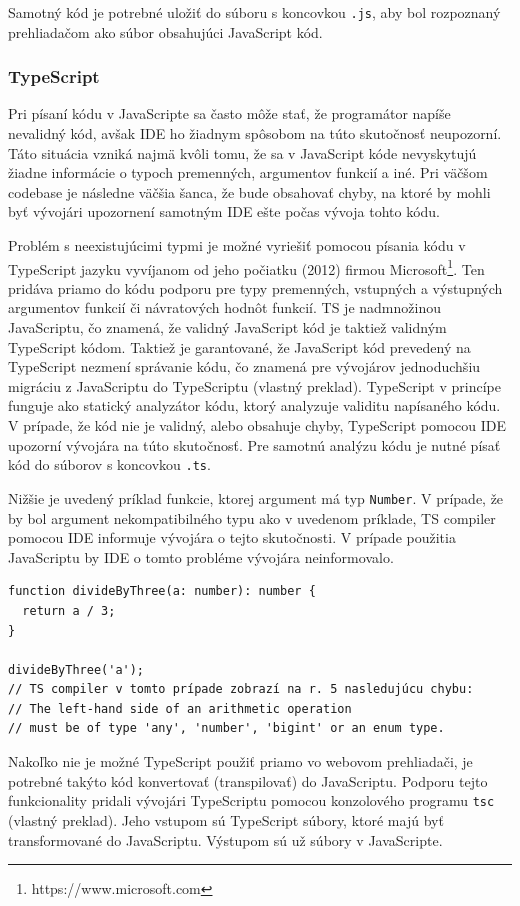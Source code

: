 Samotný kód je potrebné uložiť do súboru s koncovkou \texttt{.js}, aby bol rozpoznaný prehliadačom ako súbor obsahujúci JavaScript kód.

\subsubsection {TypeScript}
Pri písaní kódu v JavaScripte sa často môže stať, že programátor napíše nevalidný kód, avšak IDE ho žiadnym spôsobom na túto skutočnosť neupozorní. Táto situácia vzniká najmä kvôli tomu, že sa v JavaScript kóde nevyskytujú žiadne informácie o typoch premenných, argumentov funkcií a iné. Pri väčšom codebase je následne väčšia šanca, že bude obsahovať chyby, na ktoré by mohli byť vývojári upozornení samotným IDE ešte počas vývoja tohto kódu.

Problém s neexistujúcimi typmi je možné vyriešiť pomocou písania kódu v TypeScript jazyku vyvíjanom od jeho počiatku (2012) firmou Microsoft\footnote{https://www.microsoft.com}. Ten pridáva priamo do kódu podporu pre typy premenných, vstupných a výstupných argumentov funkcií či návratových hodnôt funkcií. TS je nadmnožinou JavaScriptu, čo znamená, že validný JavaScript kód je taktiež validným TypeScript kódom. Taktiež je garantované, že JavaScript kód prevedený na TypeScript nezmení správanie kódu, čo znamená pre vývojárov jednoduchšiu migráciu z JavaScriptu do TypeScriptu \cite{about_typescript} (vlastný preklad). TypeScript v princípe funguje ako statický analyzátor kódu, ktorý analyzuje validitu napísaného kódu. V prípade, že kód nie je validný, alebo obsahuje chyby, TypeScript pomocou IDE upozorní vývojára na túto skutočnosť. Pre samotnú analýzu kódu je nutné písať kód do súborov s koncovkou \texttt{.ts}.

Nižšie je uvedený príklad funkcie, ktorej argument má typ \texttt{Number}. V prípade, že by bol argument nekompatibilného typu ako v uvedenom príklade, TS compiler pomocou IDE informuje vývojára o tejto skutočnosti. V prípade použitia JavaScriptu by IDE o tomto probléme vývojára neinformovalo. 
\begin{verbatim}
function divideByThree(a: number): number {
  return a / 3;
}

divideByThree('a');
// TS compiler v tomto prípade zobrazí na r. 5 nasledujúcu chybu:
// The left-hand side of an arithmetic operation
// must be of type 'any', 'number', 'bigint' or an enum type.
\end{verbatim}

Nakoľko nie je možné TypeScript použiť priamo vo webovom prehliadači, je potrebné takýto kód konvertovať (transpilovať) do JavaScriptu. Podporu tejto funkcionality pridali vývojári TypeScriptu pomocou konzolového programu \texttt{tsc} \cite{about_typescript} (vlastný preklad). Jeho vstupom sú TypeScript súbory, ktoré majú byť transformované do JavaScriptu. Výstupom sú už súbory v JavaScripte.

